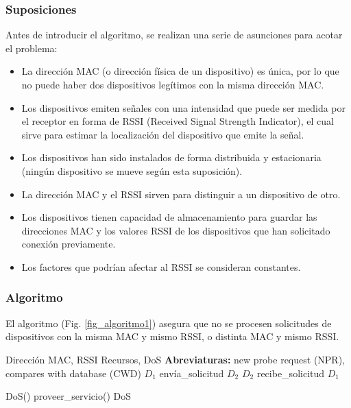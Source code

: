 \documentclass[conference,a4paper,onecolumn,11pt]{IEEEtran} %
\begin{document}
\subsubsection{Suposiciones}
Antes de introducir el algoritmo, se realizan una serie de asunciones para acotar el problema:
\begin{itemize}
    \item La dirección MAC (o dirección física de un dispositivo) es única, por lo que no puede haber dos dispositivos legítimos con la misma dirección MAC.
    \item Los dispositivos emiten señales con una intensidad que puede ser medida por el receptor en forma de RSSI (Received Signal Strength Indicator), el cual sirve para estimar la localización del dispositivo que emite la señal.
    \item Los dispositivos han sido instalados de forma distribuida y estacionaria (ningún dispositivo se mueve según esta suposición).
    \item La dirección MAC y el RSSI sirven para distinguir a un dispositivo de otro.
    \item Los dispositivos tienen capacidad de almacenamiento para guardar las direcciones MAC y los valores RSSI de los dispositivos que han solicitado conexión previamente.
    \item Los factores que podrían afectar al RSSI se consideran constantes.
\end{itemize}

\subsubsection{Algoritmo}
El algoritmo (Fig. \ref{fig_algoritmo1}) asegura que no se procesen solicitudes de dispositivos con la misma MAC y mismo RSSI, o distinta MAC y mismo RSSI.

\begin{algorithm}[H]
\caption{Filtrado de solicitudes maliciosas en la fase de descubrimiento}
\begin{algorithmic}[1]
    \Require Dirección MAC, RSSI
    \Ensure Recursos, DoS
    \Statex \textbf{Abreviaturas:} new probe request (NPR), compares with database (CWD)    
    \State $D_1$ envía\_solicitud $D_2$ 
    \State $D_2$ recibe\_solicitud $D_1$ 
    
     
         
            \State DoS() 
        \EndIf
    \Else
                \State proveer\_servicio() 
            \EndIf
        \Else
            \State DoS 
        \EndIf
    \EndIf
    \label{fig_algoritmo1}
\end{algorithmic}
\end{algorithm}
\end{document}
